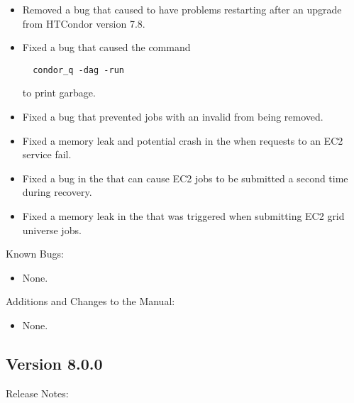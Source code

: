 \begin{itemize}
\item Removed a bug that caused  to have problems restarting
after an upgrade from HTCondor version 7.8.

\item Fixed a bug that caused the command 
\begin{verbatim}
  condor_q -dag -run
\end{verbatim}
to print garbage.

\item Fixed a bug that prevented jobs with an invalid 
from being removed.

\item Fixed a memory leak and potential crash in the 
when requests to an EC2 service fail.

\item Fixed a bug in the  that can cause EC2 jobs to be
submitted a second time during recovery.

\item Fixed a memory leak in the  that was triggered when
submitting EC2 grid universe jobs.

\end{itemize}

\noindent Known Bugs:

\begin{itemize}

\item None.

\end{itemize}

\noindent Additions and Changes to the Manual:

\begin{itemize}

\item None.

\end{itemize}


\subsection*{\label{sec:New-8-0-0}Version 8.0.0}

\noindent Release Notes:

